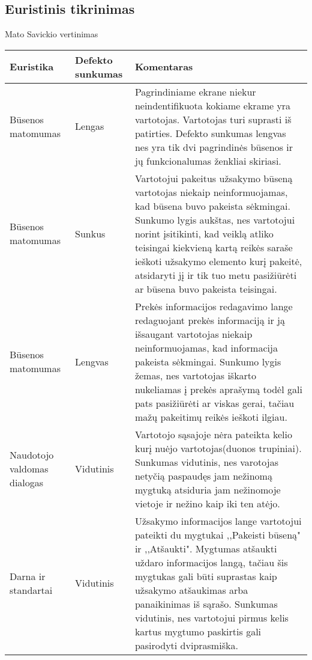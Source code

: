\documentclass[oneside]{VUMIFPSkursinis}
\begin{document}
	\subsection{Euristinis tikrinimas}
Mato Savickio vertinimas
\begin{center}
    \begin{tabular}{ |p{3cm}| p{3cm} | p{11cm} | }
    \hline
	Euristika &Defekto sunkumas & Komentaras \\ \hline
	Būsenos matomumas & Lengas & Pagrindiniame ekrane niekur neindentifikuota kokiame ekrame yra vartotojas. 
						Vartotojas turi suprasti iš patirties. 
						Defekto sunkumas lengvas nes yra tik dvi pagrindinės būsenos ir jų funkcionalumas ženkliai skiriasi. \\ \hline
	Būsenos matomumas & Sunkus & Vartotojui pakeitus užsakymo būseną vartotojas niekaip neinformuojamas, kad būsena buvo pakeista sėkmingai.
						Sunkumo lygis aukštas, nes vartotojui norint įsitikinti, kad veiklą atliko teisingai kiekvieną kartą reikės saraše ieškoti užsakymo elemento kurį pakeitė, atsidaryti jį ir tik tuo metu pasižiūrėti ar būsena buvo pakeista teisingai. \\ \hline
	Būsenos matomumas & Lengvas & Prekės informacijos redagavimo lange redaguojant prekės informaciją ir ją išsaugant vartotojas niekaip neinformuojamas, kad informacija pakeista sėkmingai.
						Sunkumo lygis žemas, nes vartotojas iškarto nukeliamas į prekės aprašymą todėl gali pats pasižiūrėti ar viskas gerai, tačiau mažų pakeitimų reikės ieškoti ilgiau. \\ \hline
	Naudotojo valdomas dialogas & Vidutinis & Vartotojo sąsajoje nėra pateikta kelio kurį nuėjo vartotojas(duonos trupiniai). 
						Sunkumas vidutinis, nes varotojas netyčią paspaudęs jam nežinomą mygtuką atsiduria jam nežinomoje vietoje ir nežino kaip iki ten atėjo. \\ \hline
	Darna ir standartai & Vidutinis & Užsakymo informacijos lange vartotojui pateikti du mygtukai ,,Pakeisti būseną" ir ,,Atšaukti".
						Mygtumas atšaukti uždaro informacijos langą, tačiau šis mygtukas gali būti suprastas kaip užsakymo atšaukimas arba panaikinimas iš sąrašo. Sunkumas vidutinis, nes vartotojui pirmus kelis kartus mygtumo paskirtis gali pasirodyti dviprasmiška. \\ \hline

   \hline
    \end{tabular}
\end{center}
\end{document}
